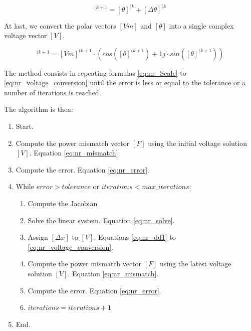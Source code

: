 \documentclass[nols,a4paper,twoside,notoc,fleqn]{tufte-book}
\begin{document}
\begin{equation}
[\theta]^{(k+1} = [\theta]^{(k} + [\Delta \theta]^{(k}
\end{equation}

At last, we convert the polar vectors  $[Vm]$ and $[\theta]$ into a single complex voltage vector $[V]$.

\begin{equation}
[V]^{(k+1} = [Vm]^{(k+1} \cdot \left( cos([\theta]^{(k+1}) + 1j \cdot sin([\theta]^{(k+1})\right)
\label{eq:nr_voltage_conversion}
\end{equation}

The method consists in repeating formulas \ref{eq:nr_Scalc} to \ref{eq:nr_voltage_conversion} until the error is less or equal to the tolerance or a number of iterations is reached.

The algorithm is then:

\begin{enumerate}

\item Start.

\item Compute the power mismatch vector $[F]$ using the initial voltage solution $[V]$. Equation \ref{eq:nr_mismatch}.

\item Compute the error. Equation \ref{eq:nr_error}.

\item While $error > tolerance$ or $iterations < max\_iterations$:

	\begin{enumerate}
	\item Compute the Jacobian
	
	\item Solve the linear system. Equation \ref{eq:nr_solve}.
	
	\item Assign $[\Delta x]$ to $[V]$. Equations \ref{eq:nr_dd1} to \ref{eq:nr_voltage_conversion}.
	
	\item Compute the power mismatch vector $[F]$ using the latest voltage solution $[V]$. Equation \ref{eq:nr_mismatch}.
	
	\item Compute the error. Equation \ref{eq:nr_error}.
	
	\item $iterations = iterations + 1$
	\end{enumerate}

\item End.
\end{enumerate}
\end{document}
